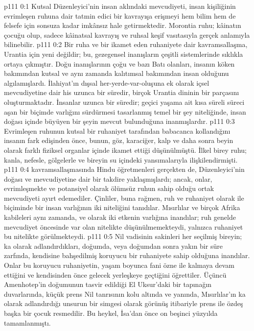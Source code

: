 \vs p111 0:1 Kutsal Düzenleyici’nin insan aklındaki mevcudiyeti, insan kişiliğinin evrimleşen ruhuna dair tatmin edici bir kavrayışa erişmeyi hem bilim hem de felsefe için sonsuza kadar imkânsız hale getirmektedir. Morontia ruhu; kâinatın çocuğu olup, sadece kâinatsal kavrayış ve ruhsal keşif vasıtasıyla gerçek anlamıyla bilinebilir.
\vs p111 0:2 Bir ruha ve bir ikamet eden ruhaniyete dair kavramsallaşma, Urantia için yeni değildir; bu, gezegensel inanışların çeşitli sistemlerinde sıklıkla ortaya çıkmıştır. Doğu inanışlarının çoğu ve bazı Batı olanları, insanın köken bakımından kutsal ve aynı zamanda kalıtımsal bakımından insan olduğunu algılamışlardı. İlahiyat’ın dışsal her\hyp{}yerde\hyp{}var\hyp{}oluşuna ek olarak içsel mevcudiyetine dair his uzunca bir süredir, birçok Urantia dininin bir parçasını oluşturmaktadır. İnsanlar uzunca bir süredir; geçici yaşama ait kısa süreli süreci aşan bir biçimde varlığını sürdürmesi tasarlanmış temel bir şey niteliğinde, insan doğası içinde büyüyen bir şeyin mevcut bulunduğuna inanmışlardır.
\vs p111 0:3 Evrimleşen ruhunun kutsal bir ruhaniyet tarafından babacanca kollandığını insanın fark edişinden önce, bunun, göz, karaciğer, kalp ve daha sonra beyin olarak farklı fiziksel organlar içinde ikamet ettiği düşünülmüştü. İlkel birey ruhu; kanla, nefesle, gölgelerle ve bireyin su içindeki yansımalarıyla ilişkilendirmişti.
\vs p111 0:4  kavramsallaşmasında Hindu öğretmenleri gerçekten de, Düzenleyici’nin doğası ve mevcudiyetine dair bir takdire yaklaşmışlardı; ancak, onlar, evrimleşmekte ve potansiyel olarak ölümsüz ruhun sahip olduğu ortak mevcudiyeti ayırt edemediler. Çinliler, buna rağmen, ruh ve ruhaniyet olarak  ile  biçiminde bir insan varlığının iki niteliğini tanıdılar. Mısırlılar ve birçok Afrika kabileleri aynı zamanda,  ve  olarak iki etkenin varlığına inandılar; ruh genelde mevcudiyet öncesinde var olan nitelikte düşünülmemekteydi, yalnızca ruhaniyet bu nitelikte görülmekteydi.
\vs p111 0:5 Nil vadisinin sakinleri her seçilmiş bireyin; ka olarak adlandırdıkları, doğumda, veya doğumdan sonra yakın bir süre zarfında, kendisine bahşedilmiş koruyucu bir ruhaniyete sahip olduğuna inandılar. Onlar bu koruyucu ruhaniyetin, yaşam boyunca fani özne ile kalmaya devam ettiğini ve kendisinden önce gelecek yerleşkeye geçtiğini öğrettiler. Üçüncü Amenhotep’in doğumunun tasvir edildiği El Uksur’daki bir tapınağın duvarlarında, küçük prens Nil tanrısının kolu altında ve yanında, Mısırlılar’ın ka olarak adlandırdığı unsurun bir simgesi olarak görünüş itibariyle prens ile özdeş başka bir çocuk resmedilir. Bu heykel, İsa’dan önce on beşinci yüzyılda tamamlanmıştı.
